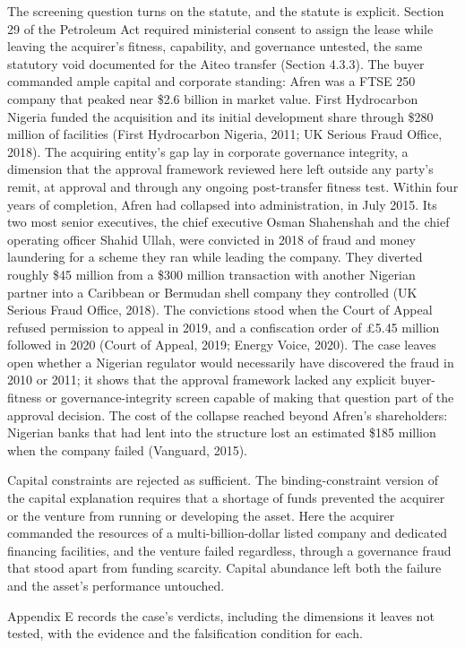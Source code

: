 \documentclass[twoside,fontset=lmodern]{mitthesis}
\begin{document}
The screening question turns on the statute, and the statute is
explicit. Section 29 of the Petroleum Act required ministerial consent
to assign the lease while leaving the acquirer's fitness, capability,
and governance untested, the same statutory void documented for the
Aiteo transfer (Section 4.3.3). The buyer commanded ample capital and
corporate standing: Afren was a FTSE 250 company that peaked near \$2.6
billion in market value. First Hydrocarbon Nigeria funded the
acquisition and its initial development share through \$280 million of
facilities (First Hydrocarbon Nigeria, 2011; UK Serious Fraud Office,
2018). The acquiring entity's gap lay in corporate governance integrity,
a dimension that the approval framework reviewed here left outside any
party's remit, at approval and through any ongoing post-transfer fitness
test. Within four years of completion, Afren had collapsed into
administration, in July 2015. Its two most senior executives, the chief
executive Osman Shahenshah and the chief operating officer Shahid Ullah,
were convicted in 2018 of fraud and money laundering for a scheme they
ran while leading the company. They diverted roughly \$45 million from a
\$300 million transaction with another Nigerian partner into a Caribbean
or Bermudan shell company they controlled (UK Serious Fraud Office,
2018). The convictions stood when the Court of Appeal refused permission
to appeal in 2019, and a confiscation order of £5.45 million followed in
2020 (Court of Appeal, 2019; Energy Voice, 2020). The case leaves open
whether a Nigerian regulator would necessarily have discovered the fraud
in 2010 or 2011; it shows that the approval framework lacked any
explicit buyer-fitness or governance-integrity screen capable of making
that question part of the approval decision. The cost of the collapse
reached beyond Afren's shareholders: Nigerian banks that had lent into
the structure lost an estimated \$185 million when the company failed
(Vanguard, 2015).

Capital constraints are rejected as sufficient. The binding-constraint
version of the capital explanation requires that a shortage of funds
prevented the acquirer or the venture from running or developing the
asset. Here the acquirer commanded the resources of a
multi-billion-dollar listed company and dedicated financing facilities,
and the venture failed regardless, through a governance fraud that stood
apart from funding scarcity. Capital abundance left both the failure and
the asset's performance untouched.

Appendix E records the case's verdicts, including the dimensions it
leaves not tested, with the evidence and the falsification condition for
each.
\end{document}
